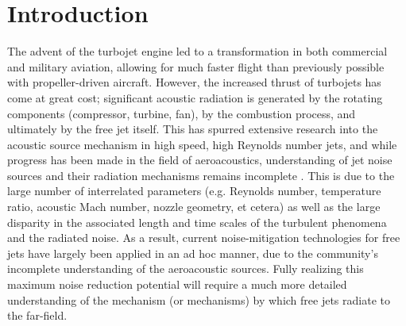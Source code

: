 \section{Introduction}
\label{introduction}
The advent of the turbojet engine led to a transformation in both commercial and military aviation, allowing for much faster flight than previously possible with propeller-driven aircraft. 
However, the increased thrust of turbojets has come at great cost; significant acoustic radiation is generated by the rotating components (compressor, turbine, fan), by the combustion process, and ultimately by the free jet itself. 
This has spurred extensive research into the acoustic source mechanism in high speed, high Reynolds number jets, and while progress has been made in the field of aeroacoustics, understanding of jet noise sources and their radiation mechanisms remains incomplete \citep{Jordan2008}.
This is due to the large number of interrelated parameters (e.g. Reynolds number, temperature ratio, acoustic Mach number, nozzle geometry, et cetera) as well as the large disparity in the associated length and time scales of the turbulent phenomena and the radiated noise.
As a result, current noise-mitigation technologies for free jets have largely been applied in an ad
hoc manner, due to the community's incomplete understanding of the aeroacoustic sources.
Fully realizing this maximum noise reduction potential will require a much more detailed understanding of the mechanism (or mechanisms) by which free jets radiate to the far-field.

